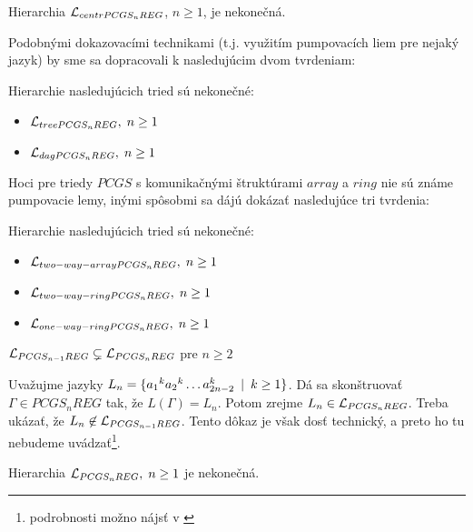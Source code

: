\begin{dosledok}
  Hierarchia $\mathcal{L}_{centrPCGS_n REG}$, $n\geq 1$, je nekonečná.
\end{dosledok}

Podobnými dokazovacími technikami (t.j. využitím pumpovacích liem
pre nejaký jazyk) by sme sa dopracovali k nasledujúcim dvom
tvrdeniam:

\begin{veta}
  Hierarchie nasledujúcich tried sú nekonečné:
  \begin{itemize}
    \item $\mathcal{L}_{treePCGS_n REG},\; n\geq 1$
    \item $\mathcal{L}_{dagPCGS_n REG},\; n\geq 1$
  \end{itemize}
\end{veta}


Hoci pre triedy $PCGS$ s komunikačnými štruktúrami $array$ a
$ring$ nie sú známe pumpovacie lemy, inými spôsobmi sa dájú
dokázať nasledujúce tri tvrdenia:

\begin{veta}
  Hierarchie nasledujúcich tried sú nekonečné:
  \begin{itemize}
    \item $\mathcal{L}_{two-way-array PCGS_n REG},\; n\geq 1$
    \item $\mathcal{L}_{two-way-ring PCGS_n REG},\; n\geq 1$
    \item $\mathcal{L}_{one-way-ring PCGS_n REG},\; n\geq 1$
  \end{itemize}
\end{veta}

\begin{veta}
  $\mathcal{L}_{PCGS_{n-1} REG} \subsetneq
    \mathcal{L}_{PCGS_n REG}$ pre
  $n\geq 2$
\end{veta}

\begin{dokaz}
  Uvažujme jazyky $L_n=\{{a_1}^k{a_2}^k\dots a^k_{2n-2}\enspace |\enspace k\geq
  1\}$. Dá sa skonštruovať \newline $\Gamma\in PCGS_nREG$ tak, že
  $L(\Gamma)=L_n$. Potom zrejme $L_n\in\mathcal{L}_{PCGS_n REG}$.
  Treba ukázať, že $L_n\not\in\mathcal{L}_{PCGS_{n-1}REG}$. Tento
  dôkaz je však dosť technický, a preto ho tu nebudeme
  uvádzať\footnote{podrobnosti možno nájsť v \cite{impact}}.
\end{dokaz}

\begin{dosledok}
  Hierarchia $\mathcal{L}_{PCGS_n REG},\; n\geq 1$ je nekonečná.
\end{dosledok}

